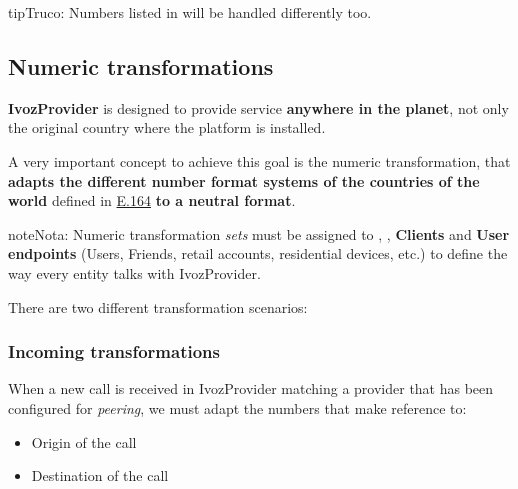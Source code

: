 \documentclass[letterpaper,10pt,spanish]{sphinxmanual}
\begin{document}
\begin{notice}{tip}{Truco:}
Numbers listed in {\hyperref[administration_portal/platform/global_special_numbers:global\string-special\string-numbers]{}} will be handled differently too.
\end{notice}


\subsection{Numeric transformations}
\label{administration_portal/brand/settings/numeric_transformations::doc}\label{administration_portal/brand/settings/numeric_transformations:transformations}\label{administration_portal/brand/settings/numeric_transformations:numeric-transformations}
\textbf{IvozProvider} is designed to provide service \textbf{anywhere in the planet}, not
only the original country where the platform is installed.

A very important concept to achieve this goal is the numeric transformation,
that \textbf{adapts the different number format systems of the countries of the world}
defined in \href{https://www.itu.int/rec/T-REC-E.164/es}{E.164} \textbf{to a neutral format}.

\begin{notice}{note}{Nota:}
Numeric transformation \emph{sets} must be assigned to {\hyperref[administration_portal/brand/providers/carriers:carriers]{}}, {\hyperref[administration_portal/brand/providers/ddi_providers:ddi\string-providers]{}}, \textbf{Clients} and \textbf{User
endpoints} (Users, Friends, retail accounts, residential devices, etc.) to define the way every entity talks
with IvozProvider.
\end{notice}

There are two different transformation scenarios:


\subsubsection{Incoming transformations}
\label{administration_portal/brand/settings/numeric_transformations:incoming-transformations}
When a new call is received in IvozProvider matching a provider that has been
configured for \emph{peering}, we must adapt the numbers that make reference to:
\begin{itemize}
\item {} 
Origin of the call

\item {} 
Destination of the call

\end{itemize}
\end{document}
